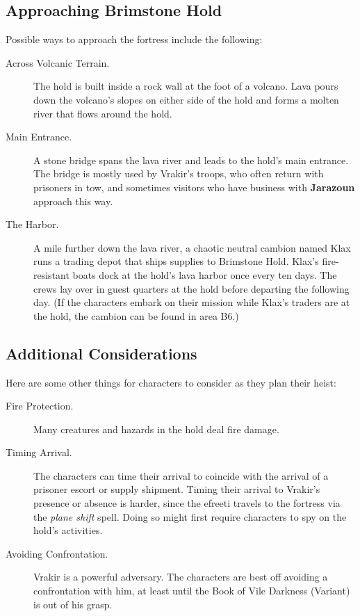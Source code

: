 \documentclass[10pt,a4paper,twoside,bg=print,twocolumn,openany,nodeprecatedcode]{dndbook}
\begin{document}
\subsection{Approaching Brimstone Hold}
Possible ways to approach the fortress include the following:


\begin{description}
\item[Across Volcanic Terrain.]
The hold is built inside a rock wall at the foot of a volcano. Lava pours down the volcano's slopes on either side of the hold and forms a molten river that flows around the hold.
\item[Main Entrance.]
A stone bridge spans the lava river and leads to the hold's main entrance. The bridge is mostly used by Vrakir's troops, who often return with prisoners in tow, and sometimes visitors who have business with \textbf{Jarazoun} approach this way.
\item[The Harbor.]
A mile further down the lava river, a chaotic neutral cambion named Klax runs a trading depot that ships supplies to Brimstone Hold. Klax's fire-resistant boats dock at the hold's lava harbor once every ten days. The crews lay over in guest quarters at the hold before departing the following day. (If the characters embark on their mission while Klax's traders are at the hold, the cambion can be found in area B6.)
\end{description}

\subsection{Additional Considerations}
Here are some other things for characters to consider as they plan their heist:


\begin{description}
\item[Fire Protection.]
Many creatures and hazards in the hold deal fire damage.
\item[Timing Arrival.]
The characters can time their arrival to coincide with the arrival of a prisoner escort or supply shipment. Timing their arrival to Vrakir's presence or absence is harder, since the efreeti travels to the fortress via the \textit{plane shift} spell. Doing so might first require characters to spy on the hold's activities.
\item[Avoiding Confrontation.]
Vrakir is a powerful adversary. The characters are best off avoiding a confrontation with him, at least until the Book of Vile Darkness (Variant) is out of his grasp.
\end{description}
\end{document}
